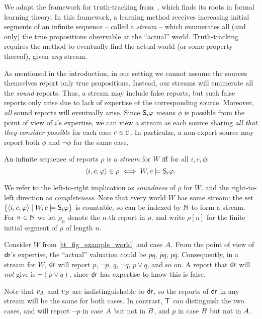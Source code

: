 We adapt the framework for truth-tracking
from~\cite{Baltag_2016,baltag_tt_2019}, which finds its roots in
formal learning theory. In this framework, a learning method receives
increasing initial segments of an infinite sequence -- called a \emph{stream}
-- which enumerates all (and only) the true propositions observable at the
``actual'' world. Truth-tracking requires the method to eventually find
the actual world (or some property thereof), given \emph{any} stream.

As mentioned in the introduction, in our setting we cannot assume the sources
themselves report only true propositions. Instead, our streams will enumerate
all the \emph{sound} reports. Thus, a stream may include false reports, but
such false reports only arise due to lack of expertise of the corresponding
source.\footnotemark{} Moreover, \emph{all} sound reports will eventually
arise. Since $\S_i\phi$ means $\phi$ is possible from the point of view of
$i$'s expertise, we can view a stream as each source sharing \emph{all that
they consider possible} for each case $c \in \css$. In particular, a non-expert
source may report both $\phi$ and $\neg\phi$ for the same case.


\begin{definition}
    \label{tt_def_stream}
    An infinite sequence of reports $\rho$ is a \emph{stream} for $W$ iff for
    all $i, c, \phi$:
    \[
        \tuple{i, c, \phi} \in \rho \iff W, c \models \S_i\phi.
    \]
\end{definition}

We refer to the left-to-right implication as \emph{soundness} of $\rho$ for
$W$, and the right-to-left direction as \emph{completeness}. Note that every
world $W$ has some stream: the set $\{\tuple{i, c, \phi} \mid W, c \models
\S_i\phi\}$ is countable, so can be indexed by $\N$ to form a stream. For $n
\in \N$ we let $\rho_n$ denote the $n$-th report in $\rho$, and write $\rho[n]$
for the finite initial segment of $\rho$ of length $n$.

\begin{example}
    \label{tt_ex_stream}
    Consider $W$ from \cref{tt_fig_example_world} and case $\patientA{}$. From the
    point of view of $\dr{}$'s expertise, the ``actual'' valuation could be $pq$,
    $\bar{p}q$, $p\bar{q}$. Consequently, in a stream for $W$, $\dr{}$ will
    report $p$, $\neg p$, $q$, $\neg q$, $p \lor q$, and so on. A report that
    $\dr{}$ will \emph{not} give is $\neg (p \lor q)$, since $\dr{}$ has
    expertise to know this is false.

    Note that $v_{\patientA{}}$ and $v_{\patientB{}}$ are indistinguishable to
    $\dr{}$, so the reports of $\dr{}$ in any stream will be the same for both
    cases. In contrast, $\tech{}$ \emph{can} distinguish the two cases, and
    will report $\neg p$ in case $\patientA{}$ but not in $\patientB{}$, and
    $p$ in case $\patientB{}$ but not in $\patientA{}$.
\end{example}

